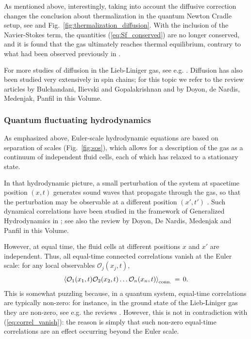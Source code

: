 \documentclass[onecolumn,amsfonts,showpacs,superscriptaddress]{revtex4-1}
\begin{document}
As mentioned above, interestingly, taking into account the diffusive correction changes the conclusion about thermalization in the quantum Newton Cradle setup, see \citep{bastianello_thermalization_2020} and Fig.~\ref{fig:thermalization_diffusion}. With the inclusion of the Navier-Stokes term, the quantities (\ref{eq:Sf_conserved}) are no longer conserved, and it is found that the gas ultimately reaches thermal equilibrium, contrary to what had been observed previously in \citep{cao2018incomplete,caux2019hydrodynamics}.


For more studies of diffusion in the Lieb-Liniger gas, see e.g. \citep{panfil2019linearized,medenjak2020diffusion}. Diffusion has also been studied very extensively in spin chains; for this topic we refer to the review articles by Bulchandani, Ilievski and Gopalakrishnan and by Doyon, de Nardis, Medenjak, Panfil in this Volume.





\subsubsection{Quantum fluctuating hydrodynamics}

As emphasized above, Euler-scale hydrodynamic equations are based on separation of scales (Fig.~\ref{fig:sos}), which allows for a description of the gas as a continuum of independent fluid cells, each of which has relaxed to a stationary state.

In that hydrodynamic picture, a small perturbation of the system at spacetime position $(x,t)$ generates sound waves that propagate through the gas, so that the perturbation may be observable at a different position $(x',t')$ \citep{kadanoff1963hydrodynamic}. Such dynamical correlations have been studied in the framework of Generalized Hydrodynamics in \citep{doyon2018exact,moller2020euler}; see also the review by Doyon, De Nardis, Medenjak and Panfil in this Volume. 


However, at equal time, the fluid cells at different positions $x$ and $x'$ are independent. Thus, all equal-time connected correlations vanish at the Euler scale: for any local observables $\mathcal{O}_j(x_j,t)$,
\begin{equation}
    \label{eq:correl_vanish}
    \left< \mathcal{O}_1(x_1, t) \mathcal{O}_2(x_2, t) \dots \mathcal{O}_n(x_n, t) \right>_{\rm conn.} \, = \, 0 .
\end{equation}
This is somewhat puzzling because, in a quantum system, equal-time correlations are typically non-zero: for instance, in the ground state of the Lieb-Liniger gas they are non-zero, see e.g. the reviews \citep{cazalilla2004bosonizing,cazalilla2011one}. However, this is not in contradiction with (\ref{eq:correl_vanish}): the reason is simply that such non-zero equal-time correlations are an effect occurring beyond the Euler scale.
\end{document}
